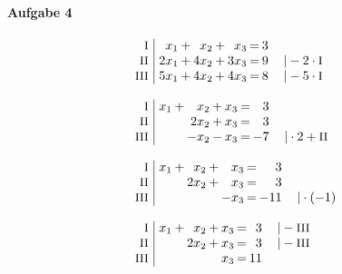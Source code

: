 \paragraph{Aufgabe 4}
\begin{equation*}
\begin{array}{l}
\setlength{\arraycolsep}{1pt}
\begin{array}{r|rcrcrcrl}
    \text{\small I } &\;  x_{1} & + &  x_{2} & + &  x_{3} & = & 3 &                              \\
   \text{\small II } &\; 2x_{1} & + & 4x_{2} & + & 3x_{3} & = & 9 & \quad|-2\cdot\text{\small I} \\
  \text{\small III } &\; 5x_{1} & + & 4x_{2} & + & 4x_{3} & = & 8 & \quad|-5\cdot\text{\small I}   
\end{array}
\\ \\
\setlength{\arraycolsep}{1pt}
\begin{array}{r|rcrcrcrl}
    \text{\small I } &\; x_{1} & + &  x_{2} & + & x_{3} & = &  3 &                               \\
   \text{\small II } &\;       &   & 2x_{2} & + & x_{3} & = &  3 &                               \\
  \text{\small III } &\;       &   & -x_{2} & - & x_{3} & = & -7 & \quad|\cdot2+\text{\small II}   
\end{array}
\\ \\
\setlength{\arraycolsep}{1pt}
\begin{array}{r|rcrcrcrl}
    \text{\small I } &\; x_{1} & + &  x_{2} & + &  x_{3} & = &   3 &                 \\
   \text{\small II } &\;       &   & 2x_{2} & + &  x_{3} & = &   3 &                 \\
  \text{\small III } &\;       &   &        &   & -x_{3} & = & -11 & \quad|\cdot(-1)   
\end{array}
\\ \\
\setlength{\arraycolsep}{1pt}
\begin{array}{r|rcrcrcrl}
    \text{\small I } &\; x_{1} & + &  x_{2} & + & x_{3} & = &  3 & \quad|-\text{\small III} \\
   \text{\small II } &\;       &   & 2x_{2} & + & x_{3} & = &  3 & \quad|-\text{\small III} \\
  \text{\small III } &\;       &   &        &   & x_{3} & = & 11 &                            
\end{array}

\end{array}
\end{equation*}
